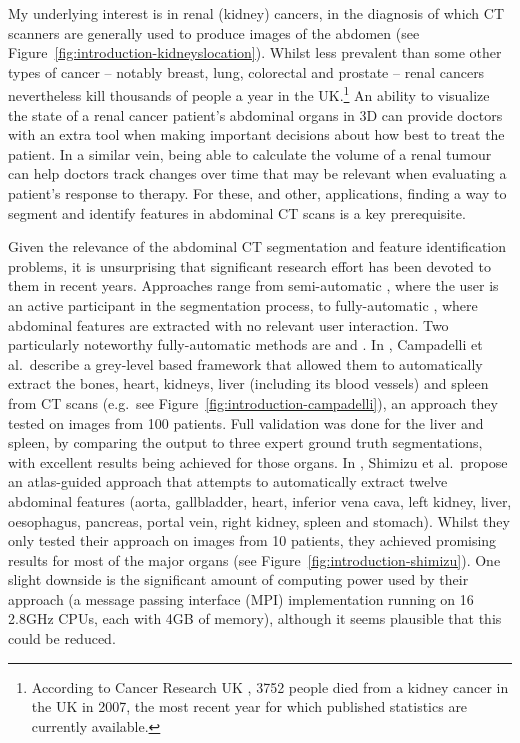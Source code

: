 My underlying interest is in renal (kidney) cancers, in the diagnosis of which CT scanners are generally used to produce images of the abdomen (see Figure~\ref{fig:introduction-kidneyslocation}). Whilst less prevalent than some other types of cancer -- notably breast, lung, colorectal and prostate -- renal cancers nevertheless kill thousands of people a year in the UK.\footnote{According to Cancer Research UK \cite{cruk-kidneycancermortality}, 3752 people died from a kidney cancer in the UK in 2007, the most recent year for which published statistics are currently available.} An ability to visualize the state of a renal cancer patient's abdominal organs in 3D can provide doctors with an extra tool when making important decisions about how best to treat the patient. In a similar vein, being able to calculate the volume of a renal tumour can help doctors track changes over time that may be relevant when evaluating a patient's response to therapy. For these, and other, applications, finding a way to segment and identify features in abdominal CT scans is a key prerequisite.

Given the relevance of the abdominal CT segmentation and feature identification problems, it is unsurprising that significant research effort has been devoted to them in recent years. Approaches range from semi-automatic \cite{?}, where the user is an active participant in the segmentation process, to fully-automatic \cite{?}, where abdominal features are extracted with no relevant user interaction. Two particularly noteworthy fully-automatic methods are \cite{campadelli09} and \cite{shimizu07}. In \cite{campadelli09}, Campadelli et al.\ describe a grey-level based framework that allowed them to automatically extract the bones, heart, kidneys, liver (including its blood vessels) and spleen from CT scans (e.g.~see Figure~\ref{fig:introduction-campadelli}), an approach they tested on images from 100 patients. Full validation was done for the liver and spleen, by comparing the output to three expert ground truth segmentations, with excellent results being achieved for those organs. In \cite{shimizu07}, Shimizu et al.\ propose an atlas-guided approach that attempts to automatically extract twelve abdominal features (aorta, gallbladder, heart, inferior vena cava, left kidney, liver, oesophagus, pancreas, portal vein, right kidney, spleen and stomach). Whilst they only tested their approach on images from 10 patients, they achieved promising results for most of the major organs (see Figure~\ref{fig:introduction-shimizu}). One slight downside is the significant amount of computing power used by their approach (a message passing interface (MPI) implementation running on 16 2.8GHz CPUs, each with 4GB of memory), although it seems plausible that this could be reduced.

